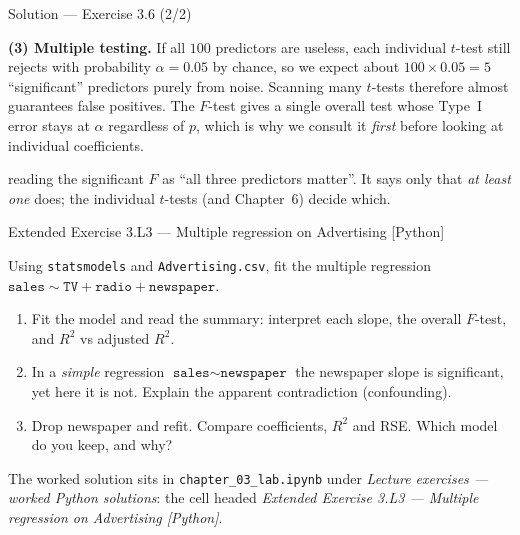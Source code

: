\documentclass[aspectratio=169,11pt]{beamer}
\begin{document}
\begin{frame}{Solution --- Exercise 3.6 (2/2)}
  \begin{solutionbox}
    \textbf{(3) Multiple testing.} If all $100$ predictors are useless,
    each individual $t$-test still rejects with probability $\alpha=0.05$
    by chance, so we expect about $100\times 0.05 = 5$ ``significant''
    predictors purely from noise. Scanning many $t$-tests therefore
    almost guarantees false positives. The $F$-test gives a single
    overall test whose Type~I error stays at $\alpha$ regardless of $p$,
    which is why we consult it \emph{first} before looking at individual
    coefficients.
  \end{solutionbox}
  \begin{mistake}
    reading the significant $F$ as ``all three
    predictors matter''. It says only that \emph{at least one} does; the
    individual $t$-tests (and Chapter~6) decide which.
  \end{mistake}
\end{frame}

\begin{frame}[fragile]{Extended Exercise 3.L3 --- Multiple regression on Advertising [Python]}
  \begin{longexercise}
    Using \texttt{statsmodels} and \texttt{Advertising.csv}, fit the
    multiple regression
    $\texttt{sales}\sim\texttt{TV}+\texttt{radio}+\texttt{newspaper}$.
    \begin{enumerate}
      \item Fit the model and read the summary: interpret each slope, the
            overall $F$-test, and $R^2$ vs adjusted $R^2$.
      \item In a \emph{simple} regression $\texttt{sales}\sim\texttt{newspaper}$
            the newspaper slope is significant, yet here it is not.
            Explain the apparent contradiction (confounding).
      \item Drop newspaper and refit. Compare coefficients, $R^2$ and RSE.
            Which model do you keep, and why?
    \end{enumerate}
  \end{longexercise}
  \begin{labnote}
    The worked solution sits in \texttt{chapter\_03\_lab.ipynb} under
    \emph{Lecture exercises --- worked Python solutions}: the cell headed
    \emph{Extended Exercise 3.L3 --- Multiple regression on Advertising [Python]}.
  \end{labnote}
\end{frame}
\end{document}

